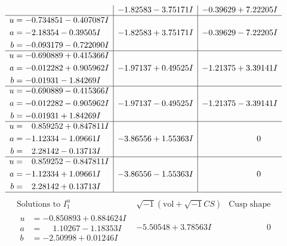 \documentclass[1p]{elsarticle_modified}
\theoremstyle{definition}
\newcommand{\I}{\sqrt{-1}}
\begin{document}
$$\begin{array}{c|c|c}
 & -1.82583 - 3.75171 I & -0.39629 + 7.22205 I \\ \hline\begin{aligned}
u &= -0.734851 - 0.407087 I \\
a &= -2.18354 - 0.39505 I \\
b &= -0.093179 - 0.722090 I\end{aligned}
 & -1.82583 + 3.75171 I & -0.39629 - 7.22205 I \\ \hline\begin{aligned}
u &= -0.690889 + 0.415366 I \\
a &= -0.012282 + 0.905962 I \\
b &= -0.01931 - 1.84269 I\end{aligned}
 & -1.97137 + 0.49525 I & -1.21375 + 3.39141 I \\ \hline\begin{aligned}
u &= -0.690889 - 0.415366 I \\
a &= -0.012282 - 0.905962 I \\
b &= -0.01931 + 1.84269 I\end{aligned}
 & -1.97137 - 0.49525 I & -1.21375 - 3.39141 I \\ \hline\begin{aligned}
u &= \phantom{-}0.859252 + 0.847811 I \\
a &= -1.12334 - 1.09661 I \\
b &= \phantom{-}2.28142 - 0.13713 I\end{aligned}
 & -3.86556 + 1.55363 I & \phantom{-0.000000 } 0 \\ \hline\begin{aligned}
u &= \phantom{-}0.859252 - 0.847811 I \\
a &= -1.12334 + 1.09661 I \\
b &= \phantom{-}2.28142 + 0.13713 I\end{aligned}
 & -3.86556 - 1.55363 I & \phantom{-0.000000 } 0\\
 \hline 
 \end{array}$$\newpage$$\begin{array}{c|c|c}  
\text{Solutions to }I^u_{1}& \I (\text{vol} + \sqrt{-1}CS) & \text{Cusp shape}\\
 \hline 
\begin{aligned}
u &= -0.850893 + 0.884624 I \\
a &= \phantom{-}1.10267 - 1.18353 I \\
b &= -2.50998 + 0.01246 I\end{aligned}
 & -5.50548 + 3.78563 I & \phantom{-0.000000 } 0 \\ \hline\begin{aligned}

\end{aligned}
\end{array}$$
\end{document}
